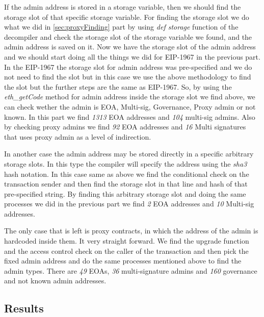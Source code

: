 If the admin address is stored in a storage variable, then we should find the storage slot of that specific storage variable. For finding the storage slot we do what we did in \ref{sec:proxyFinding} part by using \textit{def storage} function of the decompiler and check the storage slot of the storage variable we found, and the admin address is saved on it. 
Now we have the storage slot of the admin address and we should start doing all the things we did for EIP-1967 in the previous part. 
In the EIP-1967 the storage slot for admin address was pre-specified and we do not need to find the slot but in this case we use the above methodology to find the slot but the further steps are the same as EIP-1967.
So, by using the \textit{eth\_getCode} method for admin address inside the storage slot we find above, we can check wether the admin is EOA, Multi-sig, Governance, Proxy admin or not known.
In this part we find \textit{1313} EOA addresses and \textit{104} multi-sig admins. Also by checking proxy admins we find \textit{92} EOA addresses and \textit{16} Multi signatures that uses proxy admin as a level of indirection. 

In another case the admin address may be stored directly in a specific arbitrary storage slots. In this type the compiler will specify the address using the \textit{sha3} hash notation. In this case same as above we find the conditional check on the transaction sender and then find the storage slot in that line and hash of that pre-specified string. 
By finding this arbitrary storage slot and doing the same processes we did in the previous part we find \textit{2} EOA addresses and \textit{10} Multi-sig addresses.

The only case that is left is proxy contracts, in which the address of the admin is hardcoded inside them. It very straight forward. We find the upgrade function and the access control check on the caller of the transaction and then pick the fixed admin address and do the same processes mentioned above to find the admin types. There are \textit{49} EOAs, \textit{36} multi-signature admins and \textit{160} governance and not known admin addresses. 

\subsection{Results}

